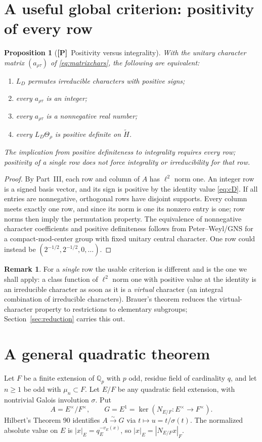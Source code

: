 \documentclass[11pt]{article}
\newcommand{\Q}{\mathbb Q}
\newcommand{\tH}{\widetilde H}
\newcommand{\Ptag}{\textnormal{\textbf{[P]}}}
\theoremstyle{plain}
\newtheorem{proposition}[theorem]{Proposition}
\theoremstyle{definition}
\newtheorem{remark}[theorem]{Remark}
\begin{document}
\section{A useful global criterion: positivity of every row}\label{sec:positive}
\begin{proposition}[\Ptag\ Positivity versus integrality]\label{prop:positive}
With the unitary character matrix $(a_{\rho\tau})$ of
\eqref{eq:matrixchars}, the following are equivalent:
\begin{enumerate}[label=(\alph*)]
\item $L_D$ permutes irreducible characters with positive signs;
\item every $a_{\rho\tau}$ is an integer;
\item every $a_{\rho\tau}$ is a nonnegative real number;
\item every $L_D\Theta_\rho$ is positive definite on $\tH$.
\end{enumerate}
The implication from positive definiteness to integrality
requires \emph{every} row; positivity of a single row does not
force integrality or irreducibility for that row.
\end{proposition}
\begin{proof}
By Part~III, each row and column of $A$ has $\ell^2$ norm one.
An integer row is a signed basis vector, and its sign is positive
by the identity value \eqref{eq:cD}.  If all entries are
nonnegative, orthogonal rows have disjoint supports.  Every
column meets exactly one row, and since its norm is one its
nonzero entry is one; row norms then imply the permutation
property.  The equivalence of nonnegative character coefficients
and positive definiteness follows from Peter--Weyl/GNS for a
compact-mod-center group with fixed unitary central character.
One row could instead be $(2^{-1/2},2^{-1/2},0,\ldots)$.
\end{proof}
\begin{remark}\label{rem:onerow}
For a \emph{single} row the usable criterion is different and is
the one we shall apply: a class function of $\ell^2$ norm one with
positive value at the identity is an irreducible character as soon
as it is a \emph{virtual} character (an integral combination of
irreducible characters).  Brauer's theorem reduces the virtual-character
property to restrictions to elementary subgroups; Section~\ref{sec:reduction}
carries this out.
\end{remark}

\section{A general quadratic theorem}\label{sec:general-toral}
Let $F$ be a finite extension of $\Q_p$ with $p$ odd, residue field of cardinality $q$, and let $n\geq1$ be odd with $\mu_n\subset F$. Let $E/F$ be any quadratic field extension, with nontrivial Galois involution $\sigma$. Put
\[
 A=E^\times/F^\times,\qquad G=E^1=\ker(N_{E/F}:E^\times\to F^\times).
\]
Hilbert's Theorem 90 identifies $A\xrightarrow{\sim}G$ via $t\mapsto u=t/\sigma(t)$. The normalized absolute value on $E$ is $|x|_E=q_E^{-v_E(x)}$, so $|x|_E=|N_{E/F}x|_F$.
\end{document}
